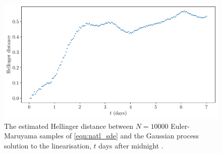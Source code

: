 \begin{figure}
	\begin{center}
		\includegraphics[width=\textwidth]{chp06_applications/figures/gulf_stream/traj_stoch_hell_dist_0.25}
		\caption{The estimated Hellinger distance between \(N = 10000\) Euler-Maruyama samples of \cref{eqn:natl_sde} and the Gaussian process solution to the linearisation, \(t\) days after midnight .}
		\label{fig:natl_hell}
	\end{center}
\end{figure}


